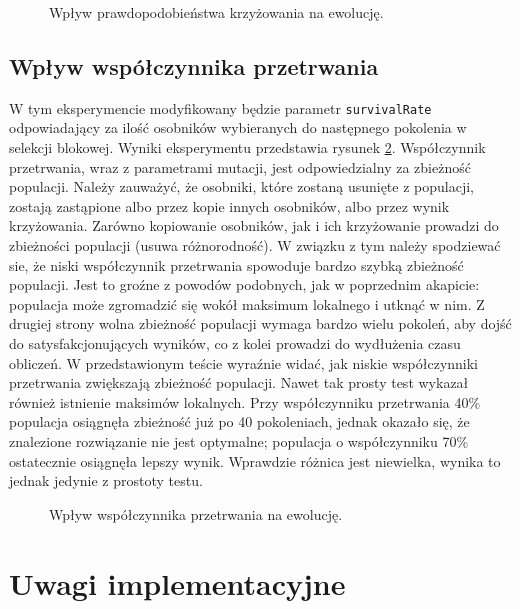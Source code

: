 \documentclass[a4paper,12pt,leqno]{article}
\begin{document}
\begin{figure}\centering
\footnotesize\vspace{-2em}
\normalsize\caption{Wpływ prawdopodobieństwa krzyżowania na ewolucję.}\label{deprop}
\end{figure}

\subsection{Wpływ współczynnika przetrwania}
W tym eksperymencie modyfikowany będzie parametr \texttt{survivalRate} odpowiadający za ilość osobników wybieranych do następnego pokolenia w
selekcji blokowej. Wyniki eksperymentu przedstawia rysunek \ref{surv}. Współczynnik przetrwania, wraz z parametrami mutacji, jest odpowiedzialny
za zbieżność populacji. Należy zauważyć, że osobniki, które zostaną usunięte z populacji, zostają zastąpione albo przez kopie innych osobników,
albo przez wynik krzyżowania. Zarówno kopiowanie osobników, jak i ich krzyżowanie prowadzi do zbieżności populacji (usuwa różnorodność). W związku
z tym należy spodziewać sie, że niski współczynnik przetrwania spowoduje bardzo szybką zbieżność populacji. Jest to groźne z powodów podobnych,
jak w poprzednim akapicie: populacja może zgromadzić się wokół maksimum lokalnego i utknąć w nim. Z drugiej strony wolna zbieżność populacji
wymaga bardzo wielu pokoleń, aby dojść do satysfakcjonujących wyników, co z kolei prowadzi do wydłużenia czasu obliczeń. W przedstawionym teście
wyraźnie widać, jak niskie współczynniki przetrwania zwiększają zbieżność populacji. Nawet tak prosty test wykazał również istnienie maksimów
lokalnych. Przy współczynniku przetrwania 40\% populacja osiągnęła zbieżność już po 40 pokoleniach, jednak okazało się, że znalezione rozwiązanie
nie jest optymalne; populacja o współczynniku 70\% ostatecznie osiągnęła lepszy wynik. Wprawdzie różnica jest niewielka, wynika to jednak jedynie
z prostoty testu.

\begin{figure}\centering
\footnotesize\vspace{-2em}
\normalsize\caption{Wpływ współczynnika przetrwania na ewolucję.}\label{surv}
\end{figure}

\section{Uwagi implementacyjne}
\end{document}

